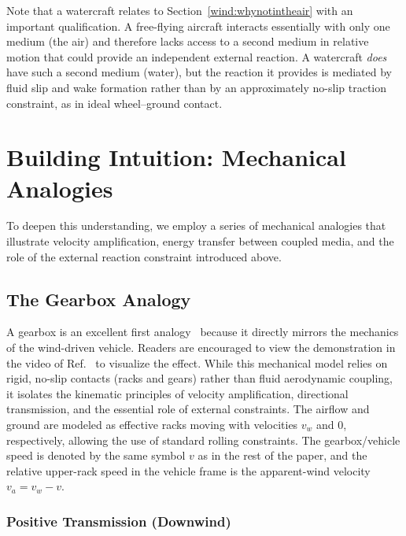 \documentclass[reprint,aps,pra,longbibliography]{revtex4-2}
\begin{document}
Note that a watercraft relates to Section~\ref{wind:whynotintheair} with an important
qualification. A free-flying aircraft interacts essentially with only one medium
(the air) and therefore lacks access to a second medium in relative motion that
could provide an independent external reaction. A watercraft \emph{does} have such
a second medium (water), but the reaction it provides is mediated by fluid slip and
wake formation rather than by an approximately no-slip traction constraint, as in
ideal wheel--ground contact.

\section{Building Intuition: Mechanical Analogies}

To deepen this understanding, we employ a series of mechanical analogies that
illustrate velocity amplification, energy transfer between coupled media, and
the role of the external reaction constraint introduced above.

\subsection{The Gearbox Analogy}

A gearbox is an excellent first analogy~\cite{veritasium_2021_physics} because it directly mirrors the mechanics of the wind-driven vehicle.
Readers are encouraged to view the demonstration in the video of Ref.~\cite{veritasium_2021_physics} to visualize the effect.
While this mechanical model relies on rigid, no-slip contacts (racks and gears) rather than fluid aerodynamic coupling, it isolates the kinematic principles of velocity amplification, directional transmission, and the essential role of external constraints.
The airflow and ground are modeled as effective racks moving with velocities
\(v_w\) and \(0\), respectively, allowing the use of standard rolling
constraints. The gearbox/vehicle speed is denoted by the same symbol \(v\) as
in the rest of the paper, and the relative upper-rack speed in the vehicle
frame is the apparent-wind velocity \(v_a=v_w-v\).

\subsubsection{Positive Transmission (Downwind)}
\end{document}
